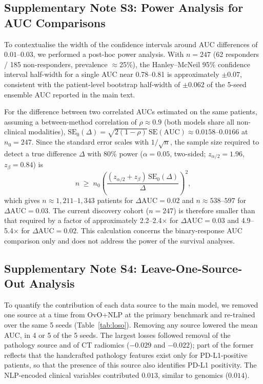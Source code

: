 \documentclass[12pt]{article}
\begin{document}
\subsection*{Supplementary Note S3: Power Analysis for AUC Comparisons}
\label{supp:note3}

To contextualise the width of the confidence intervals around AUC differences
of $0.01$--$0.03$, we performed a post-hoc power analysis. With $n = 247$ (62 responders /
185 non-responders, prevalence $\approx$25\%), the Hanley--McNeil 95\% confidence interval
half-width for a single AUC near 0.78--0.81 is approximately $\pm 0.07$, consistent with the
patient-level bootstrap half-width of $\pm 0.062$ of the 5-seed ensemble AUC reported in the
main text.

For the difference between two correlated AUCs estimated on the same
patients, assuming a between-method correlation of $\rho \approx 0.9$
(both models share all non-clinical modalities),
$\mathrm{SE}_0(\Delta) = \sqrt{2(1-\rho)}\,\mathrm{SE}(\text{AUC})
\approx 0.0158$--$0.0166$ at $n_0 = 247$.
Since the standard error scales with $1/\sqrt{n}$, the sample size required
to detect a true difference $\Delta$ with 80\% power ($\alpha = 0.05$,
two-sided; $z_{\alpha/2} = 1.96$, $z_{\beta} = 0.84$) is
\[
n \;\geq\; n_0 \left(\frac{(z_{\alpha/2} + z_{\beta})\,
\mathrm{SE}_0(\Delta)}{\Delta}\right)^{2},
\]
which gives $n \approx 1{,}211$--$1{,}343$ patients for
$\Delta\text{AUC} = 0.02$ and $n \approx 538$--$597$ for
$\Delta\text{AUC} = 0.03$.
The current discovery cohort ($n = 247$) is therefore smaller than that
required by a factor of approximately 2.2--2.4$\times$ for
$\Delta\text{AUC} = 0.03$ and 4.9--5.4$\times$ for $\Delta\text{AUC} = 0.02$.
This calculation concerns the binary-response AUC comparison only and does
not address the power of the survival analyses.

\subsection*{Supplementary Note S4: Leave-One-Source-Out Analysis}
\label{supp:note4}

To quantify the contribution of each data source to the main model, we removed one source at a
time from OvO+NLP at the primary benchmark and re-trained over the same 5 seeds
(Table~\ref{tab:loso}). Removing any source lowered the mean AUC, in 4 or 5 of the 5 seeds.
The largest losses followed removal of the pathology source and of CT radiomics ($-0.029$ and $-0.022$); part of the former reflects that the
handcrafted pathology features exist only for PD-L1-positive patients, so that the presence of this
source also identifies PD-L1 positivity. The NLP-encoded clinical variables contributed $0.013$,
similar to genomics ($0.014$).
\end{document}
